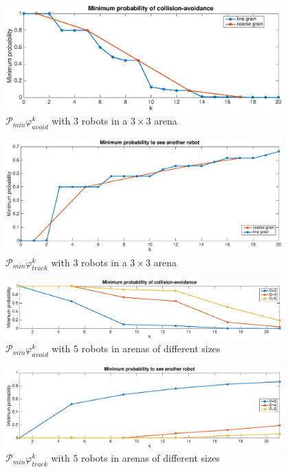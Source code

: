 \documentclass{article}
\begin{document}
\begin{figure}[htbp]
	\centering
	\includegraphics[width=0.95\textwidth]{figures/collision.eps}
	\caption{$\mathcal{P}_{min}\varphi_{avoid}^k$ with $3$ robots in a $3\times 3$ arena}
	\label{fig:pmin_collision}
\end{figure}
\begin{figure}[htbp]
	\centering
	\includegraphics[width=0.95\textwidth]{figures/tracking.eps}
	\caption{$\mathcal{P}_{min}\varphi_{track}^k$ with $3$ robots in a $3\times 3$ arena}
	\label{fig:pmin_tracking}
\end{figure}
\begin{figure}[htbp]
	\centering
	\includegraphics[width=0.95\textwidth]{figures/collisions_N5.eps}
	\caption{$\mathcal{P}_{min}\varphi_{avoid}^k$ with $5$ robots in arenas of different sizes}
	\label{fig:pmin_collision_N5}
\end{figure}
\begin{figure}[htbp]
	\centering
	\includegraphics[width=0.95\textwidth]{figures/tracking_N5.eps}
	\caption{$\mathcal{P}_{min}\varphi_{track}^k$ with $5$ robots in arenas of different sizes}
	\label{fig:pmin_tracking_N5}
\end{figure}
\end{document}
